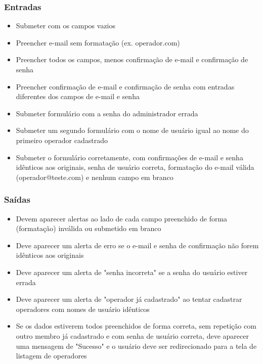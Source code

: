 \subsubsection{Entradas}

\begin{itemize}

	\item Submeter com os campos vazios 
	\item Preencher e-mail sem formatação (ex. operador.com)
	\item Preencher todos os campos, menos confirmação de e-mail e confirmação de senha
	\item Preencher confirmação de e-mail e confirmação de senha com entradas diferentes dos campos de e-mail e senha
	\item Submeter formulário com a senha do administrador errada
	\item Submeter um segundo formulário com o nome de usuário igual ao nome do primeiro operador cadastrado
	\item Submeter o formulário corretamente, com confirmações de e-mail e senha idênticos aos originais, senha de usuário correta, formatação do e-mail válida (operador@teste.com) e nenhum campo em branco
	
\end{itemize}

\subsubsection{Saídas}

\begin{itemize}

	\item Devem aparecer alertas ao lado de cada campo preenchido de forma (formatação) inválida ou submetido em branco
	\item Deve aparecer um alerta de erro se o e-mail e senha de confirmação não forem idênticos aos originais
	\item Deve aparecer um alerta de "senha incorreta" se a senha do usuário estiver errada
	\item Deve aparecer um alerta de "operador já cadastrado" ao tentar cadastrar operadores com nomes de usuário idênticos
	\item Se os dados estiverem todos preenchidos de forma correta, sem repetição com outro membro já cadastrado e com senha de usuário correta, deve aparecer uma mensagem de "Sucesso" e o usuário deve ser redirecionado para a tela de listagem de operadores
	
\end{itemize}

